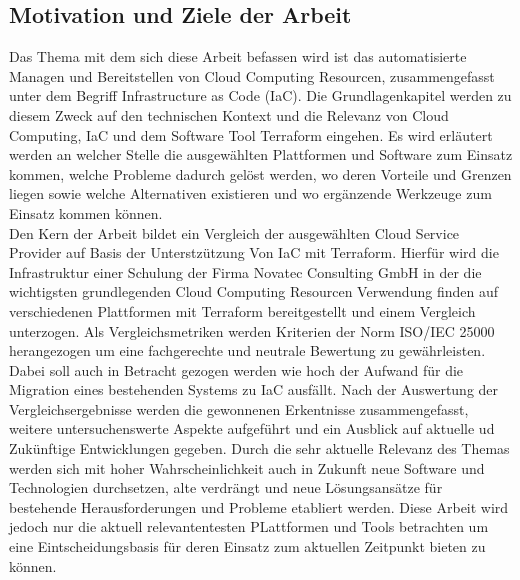 \begin{spacing}{1.2}
\section{Motivation und Ziele der Arbeit}
Das Thema mit dem sich diese Arbeit befassen wird ist das automatisierte
Managen und Bereitstellen von Cloud Computing Resourcen,
zusammengefasst unter dem Begriff Infrastructure as Code (IaC). Die Grundlagenkapitel werden zu diesem Zweck auf
den technischen Kontext und die Relevanz von Cloud Computing, IaC und
dem Software Tool Terraform eingehen.
Es wird erläutert werden an welcher Stelle die ausgewählten Plattformen
und Software zum Einsatz kommen, welche Probleme dadurch gelöst werden,
wo deren Vorteile und Grenzen liegen sowie welche Alternativen existieren
und wo ergänzende Werkzeuge zum Einsatz kommen können.\\
Den Kern der Arbeit bildet ein Vergleich der ausgewählten Cloud
Service Provider auf Basis der Unterstzützung Von IaC mit Terraform.
Hierfür wird die Infrastruktur einer Schulung der Firma Novatec
Consulting GmbH in der die wichtigsten grundlegenden Cloud Computing
Resourcen Verwendung finden auf verschiedenen Plattformen mit Terraform
bereitgestellt und einem Vergleich unterzogen.
Als Vergleichsmetriken werden Kriterien der Norm ISO/IEC 25000
herangezogen um eine fachgerechte und neutrale Bewertung zu gewährleisten.
Dabei soll auch in Betracht gezogen werden wie hoch der Aufwand für die
Migration eines bestehenden Systems zu IaC ausfällt.
Nach der Auswertung der Vergleichsergebnisse werden die gewonnenen
Erkentnisse zusammengefasst, weitere untersuchenswerte Aspekte aufgeführt
und ein Ausblick auf aktuelle ud Zukünftige Entwicklungen gegeben. Durch
die sehr aktuelle Relevanz des Themas werden sich mit hoher
Wahrscheinlichkeit auch
in Zukunft neue Software und Technologien durchsetzen, alte verdrängt und
neue Lösungsansätze für bestehende Herausforderungen und Probleme
etabliert werden. Diese Arbeit wird jedoch nur die aktuell relevantentesten
PLattformen und Tools betrachten um eine Eintscheidungsbasis für deren
Einsatz zum aktuellen Zeitpunkt bieten zu können.

\end{spacing}